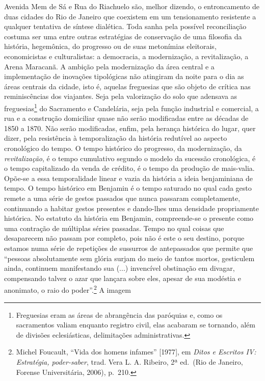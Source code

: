 Avenida Mem de Sá e Rua do Riachuelo são, melhor dizendo, o
entroncamento de duas cidades do Rio de Janeiro que coexistem em um
tensionamento resistente a qualquer tentativa de síntese dialética. Toda
sanha pela possível reconciliação costuma ser uma entre outras
estratégias de conservação de uma filosofia da história, hegemônica, do
progresso ou de suas metonímias eleitorais, economicistas e
culturalistas: a democracia, a modernização, a revitalização, a Arena
Maracanã. A ambição pela modernização da área central e a implementação
de inovações tipológicas não atingiram da noite para o dia as áreas
centrais da cidade, isto é, aquelas freguesias que são objeto de crítica
nas reminiscências dos viajantes. Seja pela valorização do solo que
adensava as freguesias\footnote{Freguesias eram as áreas de abrangência
  das paróquias e, como os sacramentos valiam enquanto registro civil,
  elas acabaram se tornando, além de divisões eclesiásticas,
  delimitações administrativas.} do Sacramento e Candelária, seja pela
função industrial e comercial, a rua e a construção domiciliar quase não
serão modificadas entre as décadas de 1850 a 1870. Não serão
modificadas, enfim, pela herança histórica do lugar, quer dizer, pela
resistência à temporalização da história redutível ao aspecto
cronológico do tempo. O tempo histórico do progresso, da modernização,
da \emph{revitalização}, é o tempo cumulativo segundo o modelo da
sucessão cronológica, é o tempo capitalizado da venda de crédito, é o
tempo da produção de mais-valia. Opõe-se a essa temporalidade linear e
vazia da história a ideia benjaminiana de tempo. O tempo histórico em
Benjamin é o tempo saturado no qual cada gesto remete a uma série de
gestos passados que nunca passaram completamente, continuando a habitar
gestos presentes e dando-lhes uma densidade propriamente histórica. No
estatuto da história em Benjamin, compreende-se o presente como uma
contração de múltiplas séries passadas. Tempo no qual coisas que
desaparecem não passam por completo, pois não é este o seu destino,
porque estamos numa série de repetições de sussurros de antepassados que
permite que ``pessoas absolutamente sem glória surjam do meio de tantos
mortos, gesticulem ainda, continuem manifestando sua (...) invencível
obstinação em divagar, compensando talvez o azar que lançara sobre eles,
apesar de sua modéstia e anonimato, o raio do poder''.\footnote{Michel
  Foucault, ``Vida dos homens infames'' {[}1977{]}, em \emph{Ditos e
  Escritos IV: Estratégia, poder-saber}, trad. Vera L. A. Ribeiro, 2ª
  ed.~(Rio de Janeiro, Forense Universitária, 2006), p.~210.} A imagem
